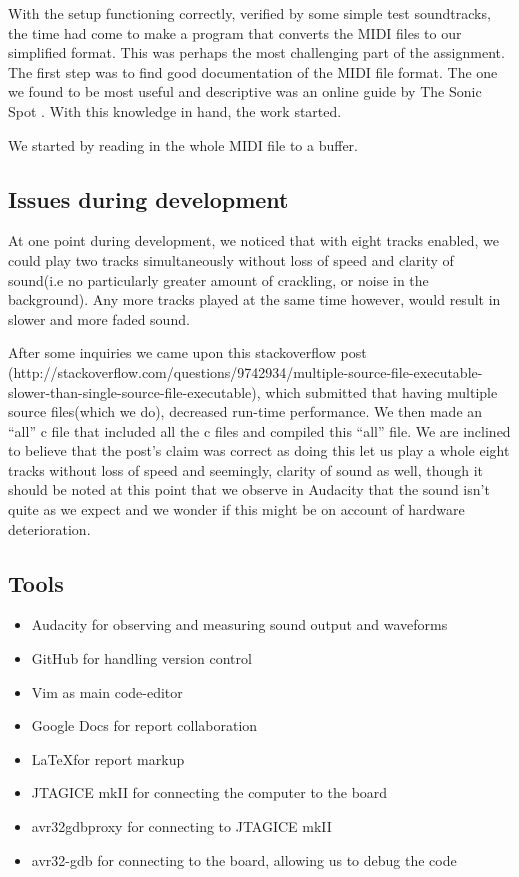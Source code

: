 \documentclass[a4paper,12pt]{article}
\begin{document}
With the setup functioning correctly, verified by some simple test soundtracks, the time had come to make a program that converts the MIDI files to our simplified format. This was perhaps the most challenging part of the assignment. The first step was to find good documentation of the MIDI file format. The one we found to be most useful and descriptive was an online guide by The Sonic Spot \cite{sonicspot}. With this knowledge in hand, the work started.

We started by reading in the whole MIDI file to a buffer.


\subsection{Issues during development}

At one point during development, we noticed that with eight tracks enabled, we could play two tracks simultaneously without loss of speed and clarity of sound(i.e no particularly greater amount of crackling, or noise in the background). Any more tracks played at the same time however, would result in slower and more faded sound.

After some inquiries we came upon this stackoverflow post (http://stackoverflow.com/questions/9742934/multiple-source-file-executable-slower-than-single-source-file-executable), which submitted that having multiple source files(which we do), decreased run-time performance. We then made an “all” c file that included all the c files and compiled this “all” file. We are inclined to believe that the post’s claim was correct as doing this let us play a whole eight tracks without loss of speed and seemingly, clarity of sound as well, though it should be noted at this point that we observe in Audacity that the sound isn’t quite as we expect and we wonder if this might be on account of hardware deterioration.


\subsection{Tools}

\begin{itemize}
\item Audacity for observing and measuring sound output and waveforms
\item GitHub for handling version control
\item Vim as main code-editor
\item Google Docs for report collaboration
\item \LaTeX for report markup
\item JTAGICE mkII for connecting the computer to the board
\item avr32gdbproxy for connecting to JTAGICE mkII
\item avr32-gdb for connecting to the board, allowing us to debug the code
\end{itemize}
\end{document}
